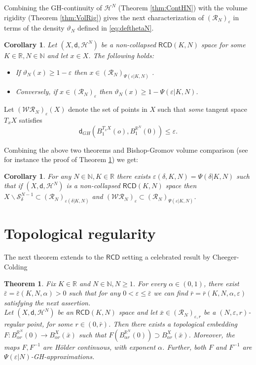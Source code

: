 \documentclass[a4paper]{amsart}
\theoremstyle{plain}
\newtheorem{theorem}[lemma]{Theorem}
\newtheorem{corollary}[lemma]{Corollary}
\theoremstyle{definition}
\numberwithin{equation}{section}
\newcommand{\R}{\mathbb{R}}
\newcommand{\N}{\mathbb{N}}
\renewcommand{\S}{\mathcal{S}}
\newcommand{\RCD}{\mathsf{RCD}}
\newcommand{\sfd}{\mathsf d}
\newcommand{\cR}{\mathcal{R}}
\newcommand{\cH}{\mathcal{H}}
\newcommand{\eps}{\varepsilon}
\newcommand{\cWR}{\mathcal{WR}}
\begin{document}
{{
Combining the GH-continuity of $\cH^{N}$ (Theorem \ref{thm:ContHN}) with the  volume rigidity (Theorem \ref{thm:VolRig}) gives the next characterization of  $(\cR_{N})_{\eps}$ in terms of the density $\vartheta_{N}$ defined in \eqref{eq:defthetaN}.
\begin{corollary}\label{cor:RNepsTheta}
Let $(X,\sfd, \cH^{N})$ be a non-collapsed $\RCD(K,N)$  space for some $K\in \R, N\in \N$ and let $x\in X$. The following holds: 
\begin{itemize}
\item If $\vartheta_{N}(x)\geq 1-\eps$ then $x\in (\cR_{N})_{\Psi(\eps|K,N)}$ .
\item Conversely, if   $x\in (\cR_{N})_{\eps}$ then  $\vartheta_{N}(x)\geq 1-\Psi(\eps|K,N)$.
\end{itemize}
\end{corollary}
}

Let $(\cWR_N)_\eps(X)$ denote the set of points in $X$ such that \emph{some} tangent space  $T_xX$ satisfies  
\[\sfd_{GH}(B_1^{T_xX}(o), B_{1}^{\R^{N}}(0))\le \eps.
\]

Combining the above two theorems and Bishop-Gromov volume comparison (see for instance the proof of Theorem \ref{thm:topologyHN}) we get: 

\begin{corollary}\label{cor-reg}
 For any $N\in\N, K\in \R$ there exists $\eps(\delta,K,N)=\Psi(\delta|K,N)$ such that 
if  $(X,\sfd,\cH^{N})$ is a non-collapsed $\RCD(K,N)$ space then  $X\backslash \S^{N-1}_\delta\subset (\cR_{N})_{\eps(\delta|K,N)}$  and $(\cWR_N)_\eps\subset (\mathcal R_N)_{\Psi(\eps|K,N)}$.
\end{corollary}



\section{Topological regularity}

The next theorem extends to the $\RCD$ setting a celebrated  result by Cheeger-Colding \cite[Theorem A.1.8]{CC97}
{ 
\begin{theorem}\label{thm:topologyHN}
Fix $K\in \R$ and $N\in \N, N\geq 1$.  For every $\alpha\in (0,1)$, there exist $\bar\varepsilon=\bar\varepsilon(K,N,\alpha)>0$ { such that for any $0<\eps\le \bar\varepsilon$ we can find  $\bar{r}=\bar{r}(K,N,\alpha,\varepsilon)$ satisfying the next assertion}.
\\Let $(X,\sfd, \cH^{N})$ be an $\RCD(K,N)$ space and let $\bar{x}\in (\cR_{N})_{\varepsilon,r}$ be a  $(N,\varepsilon,r)$-regular point, for some $r\in (0, \bar{r})$.
Then there exists a topological embedding $F:B_{\alpha r}^{\R^{N}}(0)\to B_{\alpha r}^{X}(\bar{x})$ such that $F(B_{\alpha r}^{\R^{N}}(0))\supset B_{\alpha r}^{X}(\bar{x})$.
Moreover,  the maps $F, F^{-1}$ are H\"older continuous, with exponent $\alpha$.  Further, both $F$ and $F^{-1}$ are  $\Psi(\eps|N)$-GH-approximations.
\end{theorem}
}

}
\end{document}
